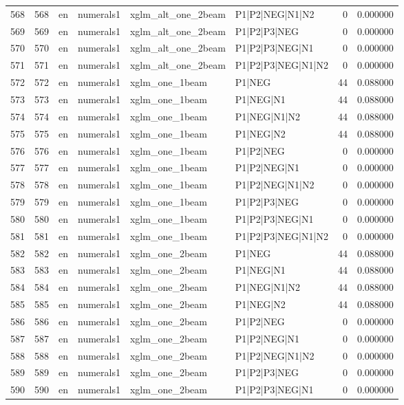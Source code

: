 \begin{tabular}{lrllllrr}
568 & 568 & en & numerals1 & xglm_alt_one_2beam & P1|P2|NEG|N1|N2 & 0 & 0.000000 \\
569 & 569 & en & numerals1 & xglm_alt_one_2beam & P1|P2|P3|NEG & 0 & 0.000000 \\
570 & 570 & en & numerals1 & xglm_alt_one_2beam & P1|P2|P3|NEG|N1 & 0 & 0.000000 \\
571 & 571 & en & numerals1 & xglm_alt_one_2beam & P1|P2|P3|NEG|N1|N2 & 0 & 0.000000 \\
572 & 572 & en & numerals1 & xglm_one_1beam & P1|NEG & 44 & 0.088000 \\
573 & 573 & en & numerals1 & xglm_one_1beam & P1|NEG|N1 & 44 & 0.088000 \\
574 & 574 & en & numerals1 & xglm_one_1beam & P1|NEG|N1|N2 & 44 & 0.088000 \\
575 & 575 & en & numerals1 & xglm_one_1beam & P1|NEG|N2 & 44 & 0.088000 \\
576 & 576 & en & numerals1 & xglm_one_1beam & P1|P2|NEG & 0 & 0.000000 \\
577 & 577 & en & numerals1 & xglm_one_1beam & P1|P2|NEG|N1 & 0 & 0.000000 \\
578 & 578 & en & numerals1 & xglm_one_1beam & P1|P2|NEG|N1|N2 & 0 & 0.000000 \\
579 & 579 & en & numerals1 & xglm_one_1beam & P1|P2|P3|NEG & 0 & 0.000000 \\
580 & 580 & en & numerals1 & xglm_one_1beam & P1|P2|P3|NEG|N1 & 0 & 0.000000 \\
581 & 581 & en & numerals1 & xglm_one_1beam & P1|P2|P3|NEG|N1|N2 & 0 & 0.000000 \\
582 & 582 & en & numerals1 & xglm_one_2beam & P1|NEG & 44 & 0.088000 \\
583 & 583 & en & numerals1 & xglm_one_2beam & P1|NEG|N1 & 44 & 0.088000 \\
584 & 584 & en & numerals1 & xglm_one_2beam & P1|NEG|N1|N2 & 44 & 0.088000 \\
585 & 585 & en & numerals1 & xglm_one_2beam & P1|NEG|N2 & 44 & 0.088000 \\
586 & 586 & en & numerals1 & xglm_one_2beam & P1|P2|NEG & 0 & 0.000000 \\
587 & 587 & en & numerals1 & xglm_one_2beam & P1|P2|NEG|N1 & 0 & 0.000000 \\
588 & 588 & en & numerals1 & xglm_one_2beam & P1|P2|NEG|N1|N2 & 0 & 0.000000 \\
589 & 589 & en & numerals1 & xglm_one_2beam & P1|P2|P3|NEG & 0 & 0.000000 \\
590 & 590 & en & numerals1 & xglm_one_2beam & P1|P2|P3|NEG|N1 & 0 & 0.000000 \\

\end{tabular}
